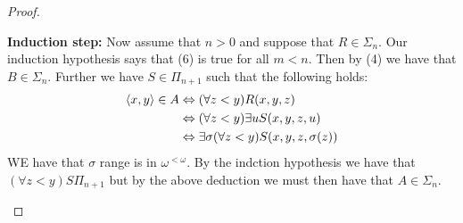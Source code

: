 \documentclass[../main.tex]{subfiles}
\begin{document}
\begin{proof}
\begin{enumerate}
			\textbf{Induction step:} Now assume that $n>0$ and
			suppose that $R\in\Sigma_n$. Our induction hypothesis
			says that (6) is true for all $m<n$. Then by (4) we
			have that $B\in\Sigma_n$. Further we have
			$S\in\Pi_{n+1}$ such that the following holds:
			\begin{align*}
				\langle x,y\rangle \in A&\Leftrightarrow(\forall z<y)
				R(x,y,z)\\
						&\Leftrightarrow(\forall z<y)
						\exists u S(x,y,z,u)\\
						&\Leftrightarrow \exists
						\sigma(\forall z<y)
						S(x,y,z,\sigma(z))
			\end{align*}
			WE have that $\sigma$ range is in $\omega^{<\omega}$.
			By the indction hypothesis we have that $(\forall
			z<y)S\Pi_{n+1}$ but by the above deduction we must then
			have that $A\in\Sigma_n$.
	\end{enumerate}
\end{proof}
\end{document}
